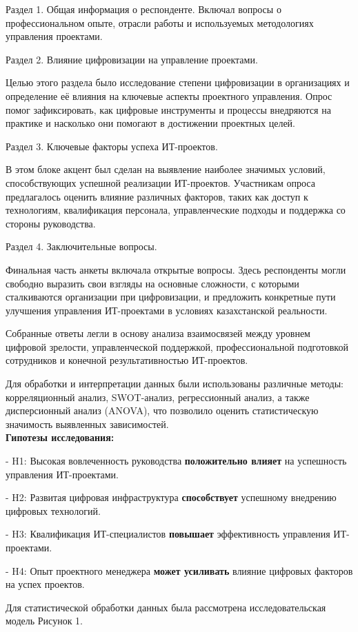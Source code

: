\begin{multicols}{2}
Раздел 1. Общая информация о респонденте. Включал вопросы о
профессиональном опыте, отрасли работы и используемых методологиях
управления проектами.

Раздел 2. Влияние цифровизации на управление проектами.

Целью этого раздела было исследование степени цифровизации в
организациях и определение её влияния на ключевые аспекты проектного
управления. Опрос помог зафиксировать, как цифровые инструменты и
процессы внедряются на практике и насколько они помогают в достижении
проектных целей.

Раздел 3. Ключевые факторы успеха ИТ-проектов.

В этом блоке акцент был сделан на выявление наиболее значимых условий,
способствующих успешной реализации ИТ-проектов. Участникам опроса
предлагалось оценить влияние различных факторов, таких как доступ к
технологиям, квалификация персонала, управленческие подходы и поддержка
со стороны руководства.

Раздел 4. Заключительные вопросы.

Финальная часть анкеты включала открытые вопросы. Здесь респонденты
могли свободно выразить свои взгляды на основные сложности, с которыми
сталкиваются организации при цифровизации, и предложить конкретные пути
улучшения управления ИТ-проектами в условиях казахстанской реальности.

Собранные ответы легли в основу анализа взаимосвязей между уровнем
цифровой зрелости, управленческой поддержкой, профессиональной
подготовкой сотрудников и конечной результативностью ИТ-проектов.

Для обработки и интерпретации данных были использованы различные методы:
корреляционный анализ, SWOT-анализ, регрессионный анализ, а также
дисперсионный анализ (ANOVA), что позволило оценить статистическую
значимость выявленных зависимостей.\\
{\bfseries Гипотезы исследования:}

- H1: Высокая вовлеченность руководства {\bfseries положительно влияет} на
успешность управления ИТ-проектами.

- H2: Развитая цифровая инфраструктура {\bfseries способствует} успешному
внедрению цифровых технологий.

- H3: Квалификация ИТ-специалистов {\bfseries повышает} эффективность
управления ИТ-проектами.

- H4: Опыт проектного менеджера {\bfseries может усиливать} влияние
цифровых факторов на успех проектов.

Для статистической обработки данных была рассмотрена исследовательская
модель Рисунок 1.
\end{multicols}

